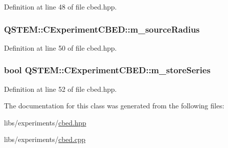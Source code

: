 Definition at line 48 of file cbed.\-hpp.

\hypertarget{class_q_s_t_e_m_1_1_c_experiment_c_b_e_d_a54be0afefeca5082d0bf452c0908dfb8}{
\subsubsection[{m\-\_\-source\-Radius}]{ Q\-S\-T\-E\-M\-::\-C\-Experiment\-C\-B\-E\-D\-::m\-\_\-source\-Radius\hspace{0.3cm}{\ttfamily [protected]}}}\label{class_q_s_t_e_m_1_1_c_experiment_c_b_e_d_a54be0afefeca5082d0bf452c0908dfb8}


Definition at line 50 of file cbed.\-hpp.

\hypertarget{class_q_s_t_e_m_1_1_c_experiment_c_b_e_d_a70acb38c6e2fc479efd4586c9c711a71}{
\subsubsection[{m\-\_\-store\-Series}]{\setlength{\rightskip}{0pt plus 5cm}bool Q\-S\-T\-E\-M\-::\-C\-Experiment\-C\-B\-E\-D\-::m\-\_\-store\-Series\hspace{0.3cm}{\ttfamily [protected]}}}\label{class_q_s_t_e_m_1_1_c_experiment_c_b_e_d_a70acb38c6e2fc479efd4586c9c711a71}


Definition at line 52 of file cbed.\-hpp.



The documentation for this class was generated from the following files\-:\begin{DoxyCompactItemize}
\item 
libs/experiments/\hyperlink{cbed_8hpp}{cbed.\-hpp}\item 
libs/experiments/\hyperlink{cbed_8cpp}{cbed.\-cpp}\end{DoxyCompactItemize}
